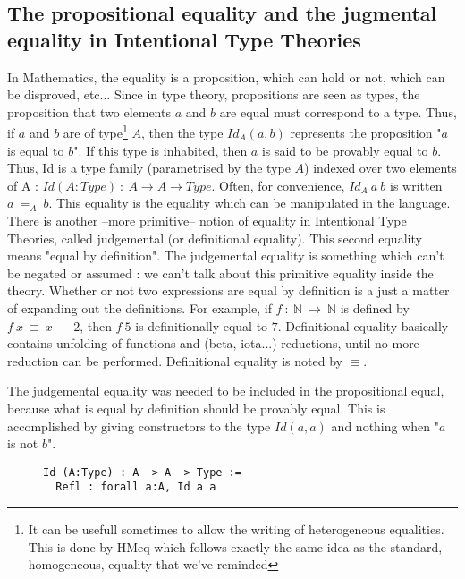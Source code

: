 \subsection{The propositional equality and the jugmental equality in Intentional Type Theories}
In Mathematics, the equality is a proposition, which can hold or not, which can be disproved, etc...
Since in type theory, propositions are seen as types, the proposition that two elements $a$ and $b$ are equal must correspond to a type. Thus, if $a$ and $b$ are of type\footnote{It can be usefull sometimes to allow the writing of heterogeneous equalities. This is done by HMeq which follows exactly the same idea as the standard, homogeneous, equality that we've reminded} $A$, then the type $Id_A(a, b)$ represents the proposition "$a$ is equal to $b$". If this type is inhabited, then $a$ is said to be provably equal to $b$.
Thus, Id is a type family (parametrised by the type $A$) indexed over two elements of A : $Id (A:Type)\ :\ A \rightarrow A \rightarrow Type$. Often, for convenience, $Id_A\ a\ b$ is written $a\ =_A\ b$.
This equality is the equality which can be manipulated in the language. There is another --more primitive-- notion of equality in Intentional Type Theories, called judgemental (or definitional equality). This second equality means "equal by definition". The judgemental equality is something which can't be negated or assumed : we can't talk about this primitive equality inside the theory. Whether or not two expressions are equal by definition is a just a matter of expanding out the definitions. For example, if $f\ :\ \mathbb{N}\ \rightarrow\ \mathbb{N}$ is defined by $f\ x\ \equiv\ x\ +\ 2$, then $f\ 5$ is definitionally equal to $7$. Definitional equality basically contains unfolding of functions and (beta, iota...) reductions, until no more reduction can be performed.
Definitional equality is noted by $\equiv$.

The judgemental equality was needed to be included in the propositional equal, because what is equal by definition should be provably equal.
This is accomplished by giving constructors to the type $Id(a,a)$ and nothing when "$a$ is not $b$".
\begin{figure}[H]
\figrule
\begin{center}
\begin{verbatim}
Id (A:Type) : A -> A -> Type :=
  Refl : forall a:A, Id a a
\end{verbatim}
\end{center}
\figrule
\end{figure}


